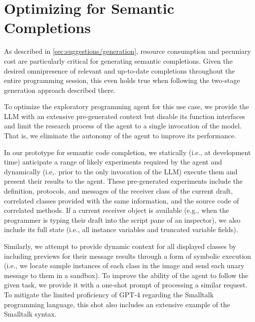 
\section{Optimizing for Semantic Completions}
\label{sec:suggestions/completions}

As described in \cref{sec:suggestions/generation}, resource consumption and pecuniary cost are particularly critical for generating semantic completions.
Given the desired omnipresence of relevant and up-to-date completions throughout the entire programming session, this even holds true when following the two-stage generation approach described there.

To optimize the exploratory programming agent for this use case, we provide the LLM with an extensive pre-generated context but disable its function interfaces and limit the research process of the agent to a single invocation of the model.
That is, we eliminate the autonomy of the agent to improve its performance. %

In our prototype for semantic code completion, we statically (i.e., at development time) anticipate a range of likely experiments required by the agent and dynamically (i.e,. prior to the only invocation of the LLM) execute them and present their results to the agent.
These pre-generated experiments include the definition, protocols, and messages of the receiver class of the current draft, correlated classes provided with the same information, and the source code of correlated methods.
If a current receiver object is available (e.g., when the programmer is typing their draft into the script pane of an inspector), we also include its full state (i.e., all instance variables and truncated variable fields).

Similarly, we attempt to provide dynamic context for all displayed classes by including previews for their message results through a form of symbolic execution (i.e., we locate sample instances of each class in the image and send each unary message to them in a sandbox). %
To improve the ability of the agent to follow the given task, we provide it with a one-shot prompt of processing a similar request.
To mitigate the limited proficiency of GPT-4 regarding the Smalltalk programming language, this shot also includes an extensive example of the Smalltalk syntax.

